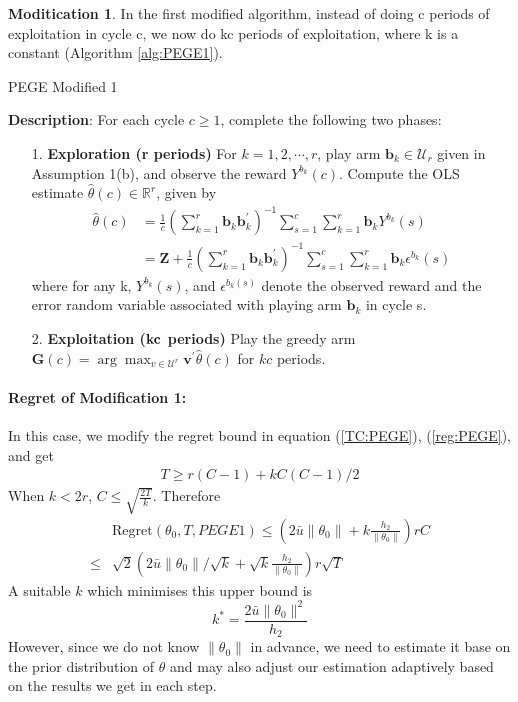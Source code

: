 \documentclass{article}
\theoremstyle{plain}
\theoremstyle{definition}
\newtheorem{modification}{Moditication}
\begin{document}
\begin{modification}
In the first modified algorithm, instead of doing c periods of exploitation in cycle c, we now do kc periods of exploitation, where k is a constant (Algorithm \ref{alg:PEGE1}).
\begin{algorithm}\label{alg:PEGE1}
\caption{PEGE Modified 1}
\textbf{Description}: For each cycle $c\geq 1$, complete the following two phases:
\begin{itemize}
\item [1. ] \textbf{Exploration (r periods)} For $k=1,2,\cdots,r$, play arm $\textbf{b}_{k}\in \mathcal{U}_{r}$ given in Assumption 1(b), and observe the reward $Y^{b_{k}}(c)$. Compute the OLS estimate $\hat{\theta}(c)\in \mathbb{R}^{r}$, given by
\begin{align}
\hat{\theta}(c)&=\frac{1}{c}(\sum_{k=1}^{r}\textbf{b}_{k}\textbf{b}_{k}^{'})^{-1}\sum_{s=1}^{c}\sum_{k=1}^{r}\textbf{b}_{k}Y^{b_{k}}(s) \nonumber \\
&=\textbf{Z}+\frac{1}{c}(\sum_{k=1}^{r}\textbf{b}_{k}\textbf{b}_{k}^{'})^{-1}\sum_{s=1}^{c}\sum_{k=1}^{r}\textbf{b}_{k}\epsilon^{b_{k}}(s) \nonumber 
\end{align}
where for any k, $Y^{b_{k}}(s)$, and $\epsilon^{b_{k}(s)}$ denote the observed reward and the error random variable associated with playing arm $\textbf{b}_{k}$ in cycle s.
\item [2. ] \textbf{Exploitation ($\bold{kc}$ periods)} Play the greedy arm $\textbf{G}(c)=\arg \max_{v\in \mathcal{U}^{r}}\textbf{v}^{'}\hat{\theta}(c)$ for $kc$ periods.
\end{itemize}
\end{algorithm}
\paragraph{Regret of Modification 1:}
In this case, we modify the regret bound in equation (\ref{TC:PEGE}), (\ref{reg:PEGE}), and get
\begin{align}
T \geq r(C-1)+k{C(C-1)}/{2}
\end{align}
When $k<2r$, $C\leq\sqrt{\frac{2T}{k}}$. Therefore
\begin{align}
& \text{Regret}(\theta_0, T, PEGE1)\leq (2\bar{u}\|\theta_0\|+k\frac{h_2}{\|\theta_0\|})rC \nonumber\\
\leq & \sqrt{2}(2\bar{u}\|\theta_0\|/\sqrt{k}+\sqrt{k}\frac{h_2}{\|\theta_0\|})r\sqrt{T}
\end{align}
A suitable $k$ which minimises this upper bound is
\[k^*=\frac{2\bar{u}\|\theta_0\|^2}{h_2}\]
However, since we do not know $\|\theta_0\|$ in advance, we need to estimate it base on the prior distribution of $\theta$ and may also adjust our estimation adaptively based on the results we get in each step.
\end{modification}
\end{document}

